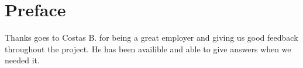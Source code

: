 \chapter*{Preface} %
\label{chap:preface}

Thanks goes to Costas B. for being a great employer and giving us good feedback
throughout the project. He has been availible and able to give answers when we
needed it.